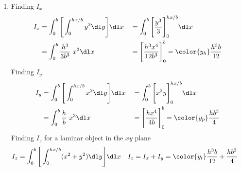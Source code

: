 \begin{enumerate}
    \item Finding $ I_x $
          \begin{align}
              I_x & = \int_{0}^{b} \Bigg[\int_{0}^{hx/b} y^2 \dl y\Bigg] \dl x &
                  & = \int_{0}^{b} \Bigg[ \frac{y^3}{3} \Bigg]_0^{hx/b} \dl x    \\
                  & = \int_{0}^{b} \frac{h^3}{3b^3}\ x^3 \dl x                 &
                  & = \Bigg[ \frac{h^3 x^4}{12b^3} \Bigg]_0^b
              = \color{y_h} \frac{h^3b}{12}
          \end{align}
          Finding $ I_y $
          \begin{align}
              I_y & = \int_{0}^{b} \Bigg[\int_{0}^{hx/b} x^2 \dl y\Bigg] \dl x &
                  & = \int_{0}^{b} \Bigg[ x^2y \Bigg]_0^{hx/b} \dl x             \\
                  & = \int_{0}^{b} \frac{h}{b}\ x^3 \dl x                      &
                  & = \Bigg[ \frac{hx^4}{4b} \Bigg]_0^b
              = \color{y_p} \frac{hb^3}{4}
          \end{align}
          Finding $ I_z $ for a laminar object in the $ xy $ plane
          \begin{align}
              I_z   & = \int_{0}^{b} \Bigg[\int_{0}^{hx/b} (x^2 + y^2) \dl y\Bigg]
              \dl x &
              I_z   & = I_x + I_y
              = \color{y_t} \frac{h^3b}{12} + \frac{hb^3}{4}
          \end{align}


\end{enumerate}
